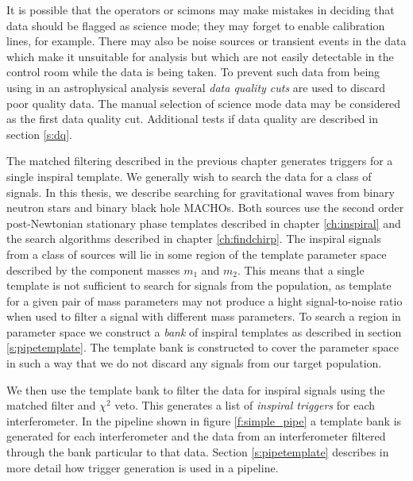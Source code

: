 It is possible that the operators or scimons may make mistakes in deciding
that data should be flagged as science mode; they may forget to enable
calibration lines, for example. There may also be noise sources or transient
events in the data which make it unsuitable for analysis but which are not
easily detectable in the control room while the data is being taken. To
prevent such data from being using in an astrophysical analysis several
\emph{data quality cuts} are used to discard poor quality data. The manual
selection of science mode data may be considered as the first data quality
cut.  Additional tests if data quality are described in section \ref{s:dq}.

The matched filtering described in the previous chapter generates triggers for
a single inspiral template. We generally wish to search the data for a class
of signals. In this thesis, we describe searching for gravitational waves from
binary neutron stars and binary black hole MACHOs.  Both sources use the
second order post-Newtonian stationary phase templates described in chapter
\ref{ch:inspiral} and the search algorithms described in chapter
\ref{ch:findchirp}. The inspiral signals from a class of sources will lie in
some region of the template parameter space described by the component masses
$m_1$ and $m_2$. This means that a single template is not sufficient to search
for signals from the population, as template for a given pair of mass
parameters may not produce a hight signal-to-noise ratio when used to filter a
signal with different mass parameters. To search a region in parameter space
we construct a \emph{bank} of inspiral templates as described in section
\ref{s:pipetemplate}. The template bank is constructed to cover the parameter
space in such a way that we do not discard any signals from our target
population.

We then use the template bank to filter the data for inspiral signals using
the matched filter and $\chi^2$ veto. This generates a list of \emph{inspiral
triggers} for each interferometer. In the pipeline shown in figure
\ref{f:simple_pipe} a template bank is generated for each interferometer and
the data from an interferometer filtered through the bank particular to that
data. Section \ref{s:pipetemplate} describes in more detail how trigger
generation is used in a pipeline.

